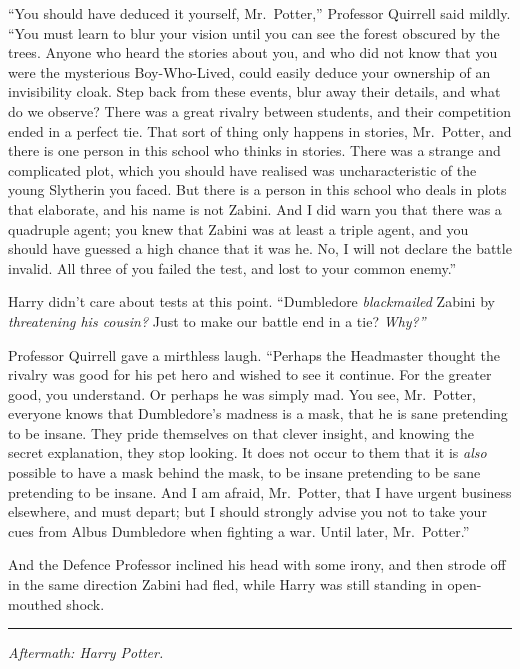 ``You should have deduced it yourself, Mr.~Potter,'' Professor Quirrell
said mildly. ``You must learn to blur your vision until you can see the
forest obscured by the trees. Anyone who heard the stories about you,
and who did not know that you were the mysterious Boy-Who-Lived, could
easily deduce your ownership of an invisibility cloak. Step back from
these events, blur away their details, and what do we observe? There was
a great rivalry between students, and their competition ended in a
perfect tie. That sort of thing only happens in stories, Mr.~Potter, and
there is one person in this school who thinks in stories. There was a
strange and complicated plot, which you should have realised was
uncharacteristic of the young Slytherin you faced. But there is a person
in this school who deals in plots that elaborate, and his name is not
Zabini. And I did warn you that there was a quadruple agent; you knew
that Zabini was at least a triple agent, and you should have guessed a
high chance that it was he. No, I will not declare the battle invalid.
All three of you failed the test, and lost to your common enemy.''

Harry didn't care about tests at this point. ``Dumbledore
\emph{blackmailed} Zabini by \emph{threatening his cousin?} Just to make
our battle end in a tie? \emph{Why?''}

Professor Quirrell gave a mirthless laugh. ``Perhaps the Headmaster
thought the rivalry was good for his pet hero and wished to see it
continue. For the greater good, you understand. Or perhaps he was simply
mad. You see, Mr.~Potter, everyone knows that Dumbledore's madness is a
mask, that he is sane pretending to be insane. They pride themselves on
that clever insight, and knowing the secret explanation, they stop
looking. It does not occur to them that it is \emph{also} possible to
have a mask behind the mask, to be insane pretending to be sane
pretending to be insane. And I am afraid, Mr.~Potter, that I have urgent
business elsewhere, and must depart; but I should strongly advise you
not to take your cues from Albus Dumbledore when fighting a war. Until
later, Mr.~Potter.''

And the Defence Professor inclined his head with some irony, and then
strode off in the same direction Zabini had fled, while Harry was still
standing in open-mouthed shock.

\begin{center}\rule{3in}{0.4pt}\end{center}

\emph{Aftermath: Harry Potter.}

